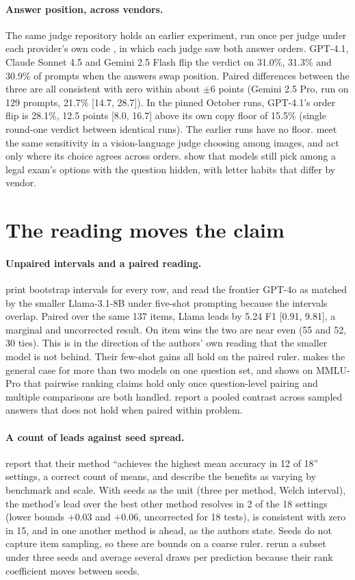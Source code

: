 \documentclass[11pt]{article}
\begin{document}
\paragraph{Answer position, across vendors.} The same judge repository holds an earlier experiment, run once per judge under each provider's
own code \citep{r2610_30512}, in which each judge saw both answer orders. GPT-4.1, Claude Sonnet 4.5 and Gemini 2.5 Flash flip the verdict on
31.0\%, 31.3\% and 30.9\% of prompts when the answers swap position. Paired differences between the three are all consistent with zero within
about $\pm 6$ points (Gemini 2.5 Pro, run on 129 prompts, 21.7\% [14.7, 28.7]). In the pinned October runs, GPT-4.1's order flip is 28.1\%,
12.5 points [8.0, 16.7] above its own copy floor of 15.5\% (single round-one verdict between identical runs). The earlier runs have no floor. \citet{r2610_01243} meet the same sensitivity in a
vision-language judge choosing among images, and act only where its choice agrees across orders. \citet{r2608_15428} show that models
still pick among a legal exam's options with the question hidden, with letter habits that differ by vendor.

\section{The reading moves the claim}
\paragraph{Unpaired intervals and a paired reading.} \citet{r2610_31256} print bootstrap intervals for every row, and read the frontier GPT-4o
as matched by the smaller Llama-3.1-8B under five-shot prompting because the intervals overlap. Paired over the same 137 items, Llama leads by
5.24 F1 [0.91, 9.81], a marginal and uncorrected result. On item wins the two are near even (55 and 52, 30 ties). This is in the direction
of the authors' own reading that the smaller model is not behind. Their few-shot gains all hold on the paired ruler. \citet{r2608_22659}
makes the general case for more than two models on one question set, and shows on MMLU-Pro that pairwise ranking claims hold only once
question-level pairing and multiple comparisons are both handled. \citet{r2608_11403} report a pooled contrast across sampled answers
that does not hold when paired within problem.
\paragraph{A count of leads against seed spread.} \citet{r2610_25626} report that their method ``achieves the highest mean accuracy in 12 of
18'' settings, a correct count of means, and describe the benefits as varying by benchmark and scale. With seeds as the unit (three per
method, Welch interval), the method's lead over the best other method resolves in 2 of the 18 settings (lower bounds $+0.03$ and $+0.06$,
uncorrected for 18 tests), is consistent with zero in 15, and in one another method is ahead, as the authors state. Seeds do not capture
item sampling, so these are bounds on a coarse ruler. \citet{r2609_25010} rerun a subset under three seeds and average several draws
per prediction because their rank coefficient moves between seeds.
\end{document}
